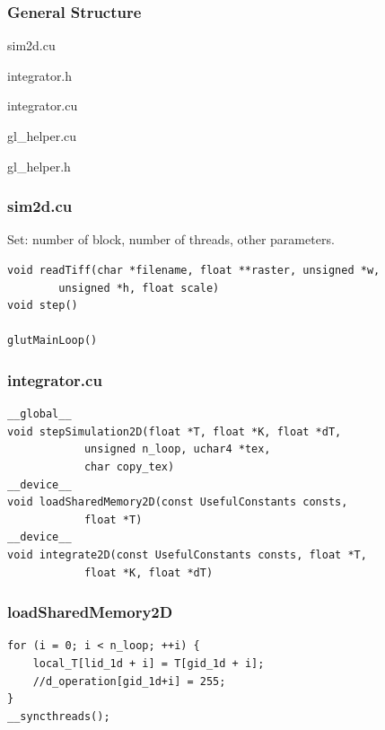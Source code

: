 \begin{frame}
\frametitle{General Structure}
\begin{center}
	sim2d.cu

	\vspace{5mm}
	integrator.h
	
	integrator.cu
	\vspace{5mm}
	
	gl\_helper.cu
	
	gl\_helper.h
\end{center}
\end{frame}

\begin{frame}[fragile]
\frametitle{sim2d.cu}
Set: number of block, number of threads, other parameters.
\vspace{10mm}
\begin{lstlisting}
void readTiff(char *filename, float **raster, unsigned *w, 
		unsigned *h, float scale)
void step()

glutMainLoop()
\end{lstlisting}
\end{frame}

\begin{frame}[fragile]
\frametitle{integrator.cu}
\begin{lstlisting}
__global__ 
void stepSimulation2D(float *T, float *K, float *dT, 
			unsigned n_loop, uchar4 *tex, 
			char copy_tex)
__device__ 
void loadSharedMemory2D(const UsefulConstants consts, 
			float *T)
__device__ 
void integrate2D(const UsefulConstants consts, float *T, 
			float *K, float *dT)
\end{lstlisting}
\end{frame}

\begin{frame}[fragile]
\frametitle{loadSharedMemory2D}
\begin{lstlisting}
for (i = 0; i < n_loop; ++i) {
	local_T[lid_1d + i] = T[gid_1d + i];
	//d_operation[gid_1d+i] = 255;
}
__syncthreads();
\end{lstlisting}
\end{frame}

